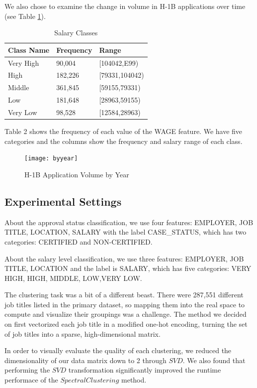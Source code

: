 \documentclass[sigconf]{acmart}
\begin{document}
We also chose to examine the change in volume in H-1B applications over time (see Table
\ref{tab:salary}).

\begin{table}[h]
	\caption{Salary Classes}
    \begin{tabular}{l l l}
        Class Name&Frequency&Range \\
        \hline
        Very High   & 90,004   & [104042,E99)\\
        High        & 182,226  & [79331,104042)\\
        Middle      & 361,845  & [59155,79331)\\
        Low         & 181,648  & [28963,59155)\\
        Very Low    & 98,528   & [12584,28963)\\
    \end{tabular}
    \label{tab:salary}
\end{table}

Table 2 shows the frequency of each value of the WAGE feature. We have five categories and the
columns show the frequency and salary range of each class.

\begin{figure}[h]
  \centering
  \texttt{[image: byyear]}
  \caption{H-1B Application Volume by Year}
\end{figure}


\subsection{Experimental Settings}
About the approval status classification, we use four features: EMPLOYER, JOB TITLE, LOCATION,
SALARY with the label CASE\_STATUS, which has two categories: CERTIFIED and NON-CERTIFIED.

About the salary level classification, we use three features: EMPLOYER, JOB TITLE, LOCATION and the
label is SALARY, which has five categories: VERY HIGH, HIGH, MIDDLE, LOW,VERY LOW.

The clustering task was a bit of a different beast. There were 287,551 different job titles listed
in the primary dataset, so mapping them into the real space to compute and visualize their groupings
was a challenge. The method we decided on first vectorized each job title in a modified one-hot
encoding, turning the set of job titles into a sparse, high-dimensional matrix.

In order to visually evaluate the quality of each clustering, we reduced the dimensionality of our
data matrix down to 2 through $SVD$. We also found that performing the $SVD$ transformation
significantly improved the runtime performace of the $SpectralClustering$ method.
\end{document}
